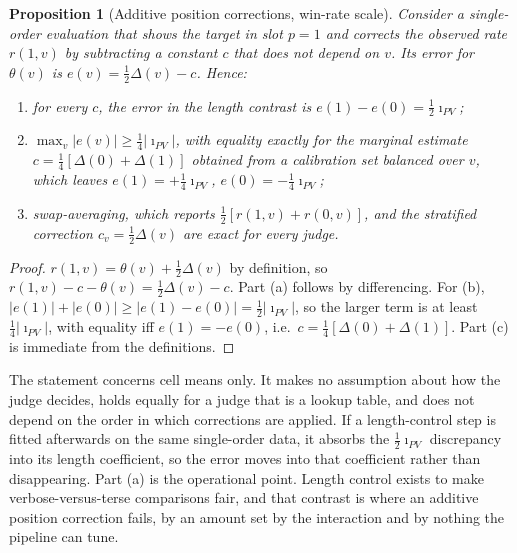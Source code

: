 \documentclass[10pt]{article}
\newtheorem{proposition}{Proposition}
\theoremstyle{remark}
\newcommand{\iPV}{\imath_{PV}}
\begin{document}
\begin{proposition}[Additive position corrections, win-rate scale]
\label{prop:additive}
Consider a single-order evaluation that shows the target in slot $p{=}1$
and corrects the observed rate $r(1,v)$ by subtracting a constant $c$
that does not depend on $v$. Its error for $\theta(v)$ is
$e(v)=\tfrac12\Delta(v)-c$. Hence:
\begin{enumerate}[label=(\alph*),itemsep=1pt,topsep=1pt]
\item for every $c$, the error in the length contrast is
  $e(1)-e(0)=\tfrac12\iPV$;
\item $\max_v|e(v)|\geq\tfrac14|\iPV|$, with equality exactly for the
  marginal estimate $c=\tfrac14[\Delta(0)+\Delta(1)]$ obtained from a
  calibration set balanced over $v$, which leaves $e(1)=+\tfrac14\iPV$,
  $e(0)=-\tfrac14\iPV$;
\item swap-averaging, which reports $\tfrac12[r(1,v)+r(0,v)]$, and the
  stratified correction $c_v=\tfrac12\Delta(v)$ are exact for every judge.
\end{enumerate}
\end{proposition}

\begin{proof}
$r(1,v)=\theta(v)+\tfrac12\Delta(v)$ by definition, so
$r(1,v)-c-\theta(v)=\tfrac12\Delta(v)-c$. Part (a) follows by
differencing. For (b), $|e(1)|+|e(0)|\geq|e(1)-e(0)|=\tfrac12|\iPV|$,
so the larger term is at least $\tfrac14|\iPV|$, with equality iff
$e(1)=-e(0)$, i.e.\ $c=\tfrac14[\Delta(0)+\Delta(1)]$. Part (c) is
immediate from the definitions.
\end{proof}

\noindent The statement concerns cell means only. It makes no assumption
about how the judge decides, holds equally for a judge that is a
lookup table, and does not depend on the order in which corrections are
applied. If a length-control step is fitted afterwards on the same
single-order data, it absorbs the $\tfrac12\iPV$ discrepancy into its
length coefficient, so the error moves into that coefficient rather than
disappearing. Part (a) is the operational point. Length control exists
to make verbose-versus-terse comparisons fair, and that contrast is
where an additive position correction fails, by an amount set by the
interaction and by nothing the pipeline can tune.
\end{document}
